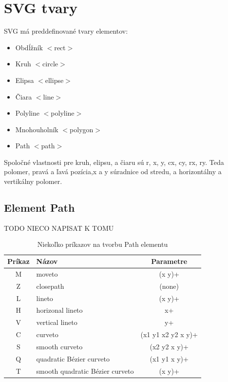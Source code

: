 \section{SVG tvary} 

\acs*{SVG} má preddefinované tvary elementov:
\begin{itemize}
	\item Obdĺžník $<$rect$>$
	\item Kruh $<$circle$>$
	\item Elipsa $<$ellipse$>$
	\item Čiara $<$line$>$
	\item Polyline $<$polyline$>$
	\item Mnohouholník $<$polygon$>$
	\item Path $<$path$>$	
\end{itemize}

Spoločné vlastnosti pre kruh, elipsu, a čiaru sú r, x, y, cx, cy, rx, ry. Teda polomer, pravá a ľavá pozícia,x a y súradnice od stredu, a horizontálny a vertikálny polomer. 

\subsection{Element Path} 

TODO NIECO NAPISAT K TOMU

\begin{center}
	\begin{table}
		\begin{center}
			\begin{tabular}{|c|l|c|}
				\hline \textbf{Príkaz} & \textbf{Názov} & \textbf{Parametre} \\
				\hline M & moveto & (x y)+ \\ 
				\hline Z & closepath & (none) \\ 
				\hline L & lineto & (x y)+ \\ 
				\hline H & horizonal lineto & x+ \\ 
				\hline V & vertical lineto & y+ \\ 
				\hline C & curveto & (x1 y1 x2 y2 x y)+ \\ 
				\hline S & smooth curveto & (x2 y2 x y)+ \\ 
				\hline Q & quadratic Bézier curveto & (x1 y1 x y)+ \\ 
				\hline T & smooth quadratic Bézier curveto & (x y)+ \\ 
				\hline 
			\end{tabular} 
		\end{center}
		\caption{Niekoľko príkazov na tvorbu Path elementu}
		\label{prikazyPath}
	\end{table}
\end{center}


